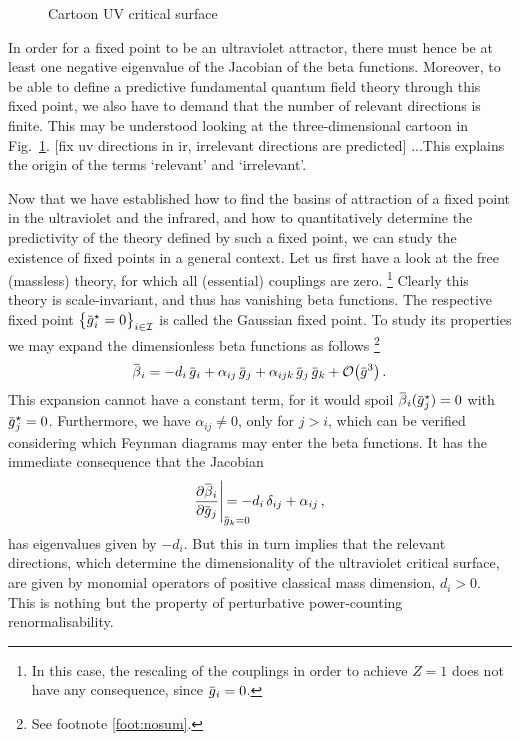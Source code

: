 \documentclass[11pt]{book}
\newcommand{\overbar}[1]{\mkern 1.5mu\overline{\mkern-1.5mu#1\mkern-1.5mu}\mkern 1.5mu}
\numberwithin{equation}{chapter}
\begin{document}
\begin{figure}
  \begin{center}
    
  \end{center}
  \vspace*{-2mm}
  \caption{
    Cartoon UV critical surface
  }
  \label{fig:uvsurface}
\end{figure}
In order for a fixed point to be an ultraviolet attractor,
there must hence be at least one negative eigenvalue
of the Jacobian of the beta functions. Moreover,
to be able to define a predictive fundamental
quantum field theory through this fixed point,
we also have to demand that the number of relevant
directions is finite. This may be understood looking
at the three-dimensional cartoon in Fig.~\ref{fig:uvsurface}.
[fix uv directions in ir, irrelevant directions are
predicted]
...This explains the origin of the terms `relevant'
and `irrelevant'.

Now that we have established how to find the basins
of attraction of a fixed point in the ultraviolet and the infrared,
and how to quantitatively determine the predictivity
of the theory defined by such a fixed point,
we can study the existence of fixed points
in a general context.
Let us first have a look at the
free (massless) theory, for which
all (essential) couplings are zero.%
\footnote{
  In this case, the rescaling of the couplings
  in order to achieve $Z=1$ does not have any consequence,
  since $\overbar g_i = 0$.
}
Clearly this
theory is scale-invariant, and thus has vanishing
beta functions. The respective fixed point
$\big\lbrace \overbar g_i^\star = 0 \big\rbrace_{i \in \mathcal I}$
is called the Gaussian fixed point.
To study its properties we may expand the dimensionless
beta functions as follows%
\footnote{
  See footnote \ref{foot:nosum}.
}
\begin{align}
  \overbar \beta_i =
  - d_i \, \overbar g_i
  + \alpha_{ij} \, \overbar g_j
  + \alpha_{ijk} \, \overbar g_j \, \overbar g_k
  + \mathcal O \big( \overbar g^3 \big) \,.
\end{align}
This expansion cannot have a constant term, for
it would spoil
$\overbar \beta_i(\overbar g_j^\star) = 0$
with $\overbar g_j^\star = 0$.
Furthermore, we have $\alpha_{ij} \neq 0$,
only for $j>i$,
which can be verified
considering which Feynman diagrams may enter the
beta functions.
It has the immediate consequence that the Jacobian
\begin{align}
  \frac{ \partial \overbar \beta_i }{ \partial \overbar g_j}
  \Bigg|_{ \overbar g_k = 0 }
  \hspace{-7mm}
  = - d_i \, \delta_{ij} + \alpha_{ij} \,,
\end{align}
has eigenvalues given by $-d_i$.
But this in turn implies that the relevant directions,
which determine the dimensionality of the ultraviolet critical surface,
are given by monomial operators of positive classical mass dimension,
$d_i > 0$.
This is nothing but the property of perturbative power-counting renormalisability.
\end{document}
